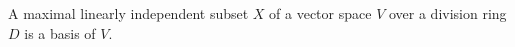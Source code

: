 A maximal linearly independent subset $X$ of a vector space $V$ over a division ring $D$ is a basis of $V$.
